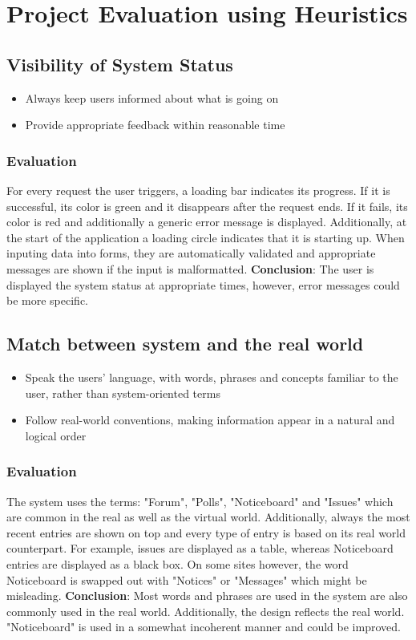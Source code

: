 \section{Project Evaluation using Heuristics}
\subsection{Visibility of System Status}

\begin{itemize}
    \item Always keep users informed about what is going on
    \item Provide appropriate feedback within reasonable time
\end{itemize}

\subsubsection{Evaluation}
For every request the user triggers, a loading bar indicates its progress. If it is successful, its color is green and it disappears after the request ends. If it fails, its color is red and additionally a generic error message is displayed. Additionally, at the start of the application a loading circle indicates that it is starting up. When inputing data into forms, they are automatically validated and appropriate messages are shown if the input is malformatted. \textbf{Conclusion}: The user is displayed the system status at appropriate times, however, error messages could be more specific.


\subsection{Match between system and the real world }

\begin{itemize}
    \item Speak the users' language, with words, phrases and concepts familiar to the user, rather than system-oriented terms
    \item Follow real-world conventions, making information appear in a natural and logical order
\end{itemize}

\subsubsection{Evaluation}
The system uses the terms: "Forum", "Polls", "Noticeboard" and "Issues" which are common in the real as well as the virtual world. Additionally, always the most recent entries are shown on top and every type of entry is based on its real world counterpart. For example, issues are displayed as a table, whereas Noticeboard entries are displayed as a black box. On some sites however, the word Noticeboard is swapped out with "Notices" or "Messages" which might be misleading. \textbf{Conclusion}: Most words and phrases are used in the system are also commonly used in the real world. Additionally, the design reflects the real world. "Noticeboard" is used in a somewhat incoherent manner and could be improved.


